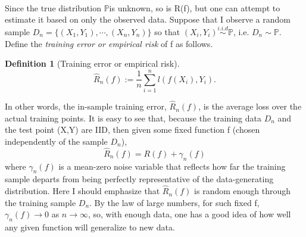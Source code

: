 \documentclass[12pt, oneside, a4paper]{article}
\def\bP{\ensuremath{\mathbb{P}}}
\theoremstyle{plain}
\renewcommand{\hat}[1]{\widehat{#1}}
\theoremstyle{definition}
\newtheorem{dfn}[thm]{Definition}
\begin{document}
 \paragraph{} Since the true distribution \bP is unknown, so is R(f), but one can attempt to estimate it based on only the 
 observed data. Suppose that I observe a random sample $D_n = \lbrace(X_1, Y_1), \cdots,  (X_n, Y_n) \rbrace$ so that 
 $(X_i, Y_i) \stackrel{i.i.d}{\sim} \bP$, i.e. $D_n \sim \bP$. Define the \textit{training error or empirical risk} of 
 f as follows.
 \begin{dfn}[Training error or empirical risk]
 \begin{equation}\hat{R}_{n}(f):=  \dfrac{1}{n} \sum_{i=1}^{n} l(f(X_i),Y_i).
\end{equation}

 \end{dfn}
 In other words, the in-sample training error, $\hat{R}_n(f)$, is the average loss over the actual training points. 
It is easy to see that, because the training data $D_n$ and the test point (X,Y) are IID, then given some fixed function f (chosen 
independently of the sample $D_n$), 
\begin{equation}
\hat{R}_n(f) = R(f) + \gamma_n(f)
\end{equation}
where $\gamma_n(f)$ is a mean-zero noise variable that reflects how far the training sample departs from being perfectly representative of the data-generating distribution.  Here I should emphasize that $\hat{R}_n(f)$ is random enough through the training sample 
$D_n$. By the law of large numbers, for such fixed f, $\gamma_n(f) \rightarrow 0$ as $n \rightarrow \infty$, so, with enough data,
one has a good idea of how well any given function will generalize to new data.
\end{document}
